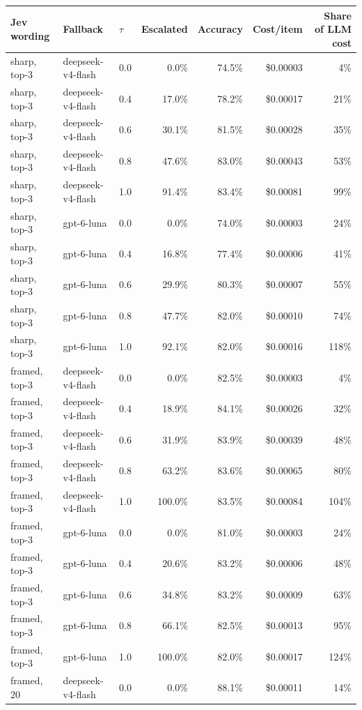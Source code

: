 \begin{tabular}{@{}lllrrrr@{}}
\toprule
Jev wording & Fallback & $\tau$ & Escalated & Accuracy & Cost/item & Share of LLM cost \\
\midrule
sharp, top-3 & deepseek-v4-flash & 0.0 & 0.0\% & 74.5\% & \$0.00003 & 4\% \\
sharp, top-3 & deepseek-v4-flash & 0.4 & 17.0\% & 78.2\% & \$0.00017 & 21\% \\
sharp, top-3 & deepseek-v4-flash & 0.6 & 30.1\% & 81.5\% & \$0.00028 & 35\% \\
sharp, top-3 & deepseek-v4-flash & 0.8 & 47.6\% & 83.0\% & \$0.00043 & 53\% \\
sharp, top-3 & deepseek-v4-flash & 1.0 & 91.4\% & 83.4\% & \$0.00081 & 99\% \\
sharp, top-3 & gpt-6-luna & 0.0 & 0.0\% & 74.0\% & \$0.00003 & 24\% \\
sharp, top-3 & gpt-6-luna & 0.4 & 16.8\% & 77.4\% & \$0.00006 & 41\% \\
sharp, top-3 & gpt-6-luna & 0.6 & 29.9\% & 80.3\% & \$0.00007 & 55\% \\
sharp, top-3 & gpt-6-luna & 0.8 & 47.7\% & 82.0\% & \$0.00010 & 74\% \\
sharp, top-3 & gpt-6-luna & 1.0 & 92.1\% & 82.0\% & \$0.00016 & 118\% \\
framed, top-3 & deepseek-v4-flash & 0.0 & 0.0\% & 82.5\% & \$0.00003 & 4\% \\
framed, top-3 & deepseek-v4-flash & 0.4 & 18.9\% & 84.1\% & \$0.00026 & 32\% \\
framed, top-3 & deepseek-v4-flash & 0.6 & 31.9\% & 83.9\% & \$0.00039 & 48\% \\
framed, top-3 & deepseek-v4-flash & 0.8 & 63.2\% & 83.6\% & \$0.00065 & 80\% \\
framed, top-3 & deepseek-v4-flash & 1.0 & 100.0\% & 83.5\% & \$0.00084 & 104\% \\
framed, top-3 & gpt-6-luna & 0.0 & 0.0\% & 81.0\% & \$0.00003 & 24\% \\
framed, top-3 & gpt-6-luna & 0.4 & 20.6\% & 83.2\% & \$0.00006 & 48\% \\
framed, top-3 & gpt-6-luna & 0.6 & 34.8\% & 83.2\% & \$0.00009 & 63\% \\
framed, top-3 & gpt-6-luna & 0.8 & 66.1\% & 82.5\% & \$0.00013 & 95\% \\
framed, top-3 & gpt-6-luna & 1.0 & 100.0\% & 82.0\% & \$0.00017 & 124\% \\
framed, 20 & deepseek-v4-flash & 0.0 & 0.0\% & 88.1\% & \$0.00011 & 14\% \\

\end{tabular}
